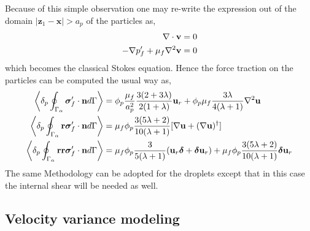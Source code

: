 \documentclass[12pt]{My_preprint}
\begin{document}
Because of this simple observation one may re-write the expression out of the domain $|\textbf{z}_1 - \textbf{x}| >a_p$ of the particles as, 
\begin{align}
    \mathbf{\nabla}\cdot \textbf{v} &= 0 \\
    - \mathbf{\nabla} p_f'
    + \mu_f \mathbf{\nabla}^2 \textbf{v}
    &= 0 
\end{align}
which becomes the classical Stokes equation. 
Hence the force traction on the particles can be computed the usual way as, 
\begin{align}
    \left<\delta_{p} \oint_{\Gamma_{\alpha}} \bm\sigma_f'\cdot \textbf{n} d\Gamma\right> &
    =
    \phi_p
    \frac{\mu_f}{a_p^2}
    \frac{3(2+3\lambda)}{2(1+\lambda)}\textbf{u}_r
    + \phi_p\mu_f  \frac{3\lambda}{4(\lambda +1)} \mathbf{\nabla}^2 \textbf{u}
    \\
    \left<\delta_{p} \oint_{\Gamma_{\alpha}} \textbf{r}\bm\sigma_f'\cdot \textbf{n} d\Gamma\right> &
    = \mu_f \phi_p 
    \frac{3(5\lambda +2)}{10(\lambda +1)}[\mathbf{\nabla} \textbf{u}+ (\mathbf{\nabla} \textbf{u})^\dagger]
    \\
    \left<\delta_{p} \oint_{\Gamma_{\alpha}} \textbf{rr}\bm\sigma_f'\cdot \textbf{n} d\Gamma\right> &
    =
    \mu_f \phi_p \frac{3}{5(\lambda +1)} (\textbf{u}_r \bm\delta + \bm\delta \textbf{u}_r)
    + \mu_f \phi_p \frac{3(5\lambda +2)}{10(\lambda+1)}\bm\delta \textbf{u}_r
\end{align}
The same Methodology can be adopted for the droplets except that in this case the internal shear will be needed as well. 

\subsection{Velocity variance modeling}
\end{document}
